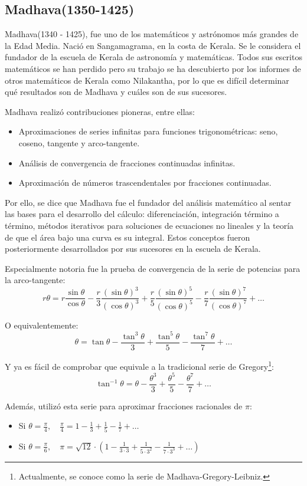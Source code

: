 \documentclass[a4paper, 11pt]{article}
\begin{document}
	\subsection{Madhava(1350-1425)}
		Madhava(1340 - 1425), fue uno de los matemáticos y astrónomos más grandes de la Edad Media. Nació en Sangamagrama,
		en la costa de Kerala. Se le considera el fundador de la escuela de Kerala de astronomía y matemáticas. Todos
		sus escritos matemáticos se han perdido pero su trabajo se ha descubierto por los informes de otros matemáticos
		de Kerala como Nilakantha, por lo que es difícil determinar qué resultados son de Madhava y cuáles son de sus
		sucesores.
		
		Madhava realizó contribuciones pioneras, entre ellas:
		\begin{itemize}
			\item Aproximaciones de series infinitas para funciones trigonométricas: seno, coseno, tangente y arco-tangente.
			\item Análisis de convergencia de fracciones continuadas infinitas.
			\item Aproximación de números trascendentales por fracciones continuadas.
		\end{itemize}

		Por ello, se dice que Madhava fue el fundador del análisis matemático al sentar las bases para el desarrollo del
		cálculo: diferenciación, integración término a término, métodos iterativos para soluciones de ecuaciones no lineales
		y la teoría de que el área bajo una curva es su integral. Estos conceptos fueron posteriormente desarrollados por
		sus sucesores en la escuela de Kerala.
		
		Especialmente notoria fue la prueba de convergencia de la serie de potencias para la arco-tangente:
		$$r \theta = r \frac{\sin \theta}{\cos \theta} - \frac{r}{3} \frac{(\sin \theta)^3}{(\cos \theta)^3} +
		\frac{r}{5} \frac{(\sin \theta)^5}{(\cos \theta)^{5}} - \frac{r}{7} \frac{(\sin \theta)^7}{(\cos \theta)^7} + \dots $$

		O equivalentemente:
		$$\theta = \tan \theta - \frac{\tan^3 \theta}{3} + \frac{\tan^5 \theta}{5} - \frac{\tan^7 \theta}{7} + \dots$$
		
		Y ya es fácil de comprobar que equivale a la tradicional serie de Gregory\footnote{Actualmente, se conoce como
		la serie de Madhava-Gregory-Leibniz.}:
		$$\tan^{-1} \theta = \theta - \frac{\theta^3}{3} + \frac{\theta^5}{5} - \frac{\theta^7}{7} + \dots$$		

		Además, utilizó esta serie para aproximar fracciones racionales de $\pi$:
		\begin{itemize}
			\item Si $\displaystyle \theta = \frac{\pi}{4}, \quad \frac{\pi}{4} = 1 - \frac{1}{3} + \frac{1}{5}
			- \frac{1}{7} + \dots$
			\item Si $\displaystyle \theta = \frac{\pi}{6}, \quad \pi = \sqrt{12} \cdot \left(1 - \frac{1}{3 \cdot 3}
			+ \frac{1}{5 \cdot 3^2} - \frac{1}{7 \cdot 3^3} + \dots \right)$
		\end{itemize}
		
\end{document}
